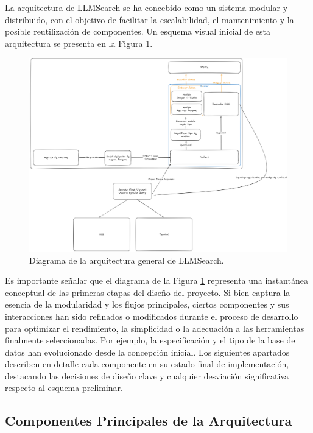 La arquitectura de LLMSearch se ha concebido como un sistema modular y distribuido, con el objetivo de facilitar la escalabilidad, el mantenimiento y la posible reutilización de componentes. Un esquema visual inicial de esta arquitectura se presenta en la Figura \ref{fig:arquitectura_general}.

\begin{figure}[H]
  \centering
  \includegraphics[width=\textwidth]{archivos/arquitectura.png}
  \caption[Arquitectura de LLMSearch]{Diagrama de la arquitectura general de LLMSearch.}
  \label{fig:arquitectura_general}
\end{figure}

Es importante señalar que el diagrama de la Figura \ref{fig:arquitectura_general} representa una instantánea conceptual de las primeras etapas del diseño del proyecto. Si bien captura la esencia de la modularidad y los flujos principales, ciertos componentes y sus interacciones han sido refinados o modificados durante el proceso de desarrollo para optimizar el rendimiento, la simplicidad o la adecuación a las herramientas finalmente seleccionadas. Por ejemplo, la especificación y el tipo de la base de datos han evolucionado desde la concepción inicial. Los siguientes apartados describen en detalle cada componente en su estado final de implementación, destacando las decisiones de diseño clave y cualquier desviación significativa respecto al esquema preliminar.

\subsection{Componentes Principales de la Arquitectura}

